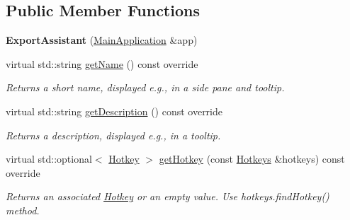 \subsection*{Public Member Functions}
\begin{DoxyCompactItemize}
\item 
\mbox{\label{classpepr3d_1_1_export_assistant_a6a210a4059ae4d63eaf3568863906fb2}} 
{\bfseries Export\+Assistant} (\mbox{\hyperlink{classpepr3d_1_1_main_application}{Main\+Application}} \&app)
\item 
\mbox{\label{classpepr3d_1_1_export_assistant_a2763d4ce06d7b48ab8034484d66e8465}} 
virtual std\+::string \mbox{\hyperlink{classpepr3d_1_1_export_assistant_a2763d4ce06d7b48ab8034484d66e8465}{get\+Name}} () const override
\begin{DoxyCompactList}\small\item\em Returns a short name, displayed e.\+g., in a side pane and tooltip. \end{DoxyCompactList}\item 
\mbox{\label{classpepr3d_1_1_export_assistant_aee997d81f569128c7ace00c601fdd879}} 
virtual std\+::string \mbox{\hyperlink{classpepr3d_1_1_export_assistant_aee997d81f569128c7ace00c601fdd879}{get\+Description}} () const override
\begin{DoxyCompactList}\small\item\em Returns a description, displayed e.\+g., in a tooltip. \end{DoxyCompactList}\item 
\mbox{\label{classpepr3d_1_1_export_assistant_a28db381b8657b27eb3c88428f3b2dd27}} 
virtual std\+::optional$<$ \mbox{\hyperlink{structpepr3d_1_1_hotkey}{Hotkey}} $>$ \mbox{\hyperlink{classpepr3d_1_1_export_assistant_a28db381b8657b27eb3c88428f3b2dd27}{get\+Hotkey}} (const \mbox{\hyperlink{classpepr3d_1_1_hotkeys}{Hotkeys}} \&hotkeys) const override
\begin{DoxyCompactList}\small\item\em Returns an associated \mbox{\hyperlink{structpepr3d_1_1_hotkey}{Hotkey}} or an empty value. Use hotkeys.\+find\+Hotkey() method. \end{DoxyCompactList}\item 
\mbox{\label{classpepr3d_1_1_export_assistant_aa959ec6d01b6fdef8f3f094ef8e9eb95}} 

\end{DoxyCompactItemize}
